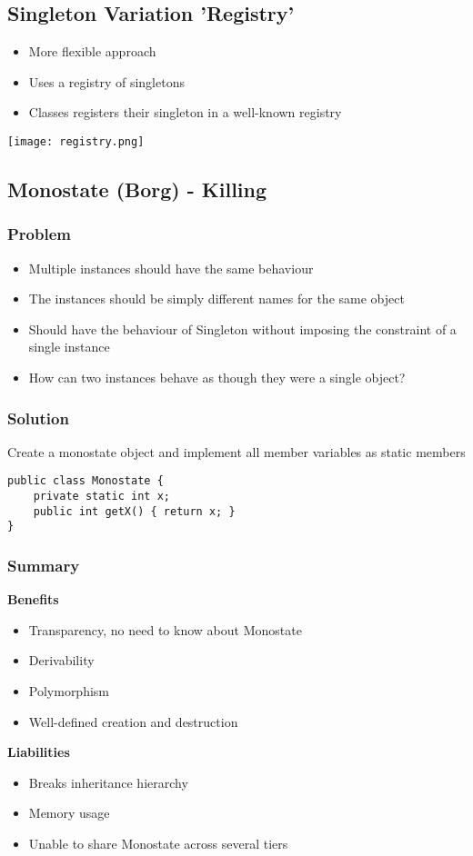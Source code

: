 \subsection{Singleton Variation 'Registry'}
\begin{itemize}
    \item More flexible approach
    \item Uses a registry of singletons
    \item Classes registers their singleton in a well-known registry
\end{itemize}
\texttt{[image: registry.png]}

\subsection{Monostate (Borg) - Killing}
\subsubsection{Problem}
\begin{itemize}
    \item Multiple instances should have the same behaviour
    \item The instances should be simply different names for the same object
    \item Should have the behaviour of Singleton without imposing the constraint of a single instance
    \item How can two instances behave as though they were a single object?
\end{itemize}
\subsubsection{Solution}
Create a monostate object and implement all member variables as static members
\begin{lstlisting}
public class Monostate {
    private static int x;
    public int getX() { return x; }
}
\end{lstlisting}
\subsubsection{Summary}
\textbf{Benefits}
\begin{itemize}
    \item Transparency, no need to know about Monostate
    \item Derivability
    \item Polymorphism
    \item Well-defined creation and destruction
\end{itemize}
\textbf{Liabilities}
\begin{itemize}
    \item Breaks inheritance hierarchy
    \item Memory usage
    \item Unable to share Monostate across several tiers
\end{itemize}

